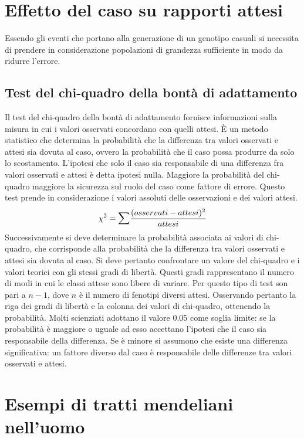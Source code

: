 \section{Effetto del caso su rapporti attesi}
Essendo gli eventi che portano alla generazione di un genotipo casuali si necessita di prendere in considerazione popolazioni di grandezza sufficiente in modo da ridurre l'errore.
\subsection{Test del chi-quadro della bont\`a di adattamento}
Il test del chi-quadro della bont\`a di adattamento fornisce informazioni sulla misura in cui i valori osservati concordano con quelli attesi. \`E un metodo statistico che determina la probabilit\`a
che la differenza tra valori osservati e attesi sia dovuta al caso, ovvero la probabilit\`a che il caso possa produrre da solo lo scostamento. L'ipotesi che solo il caso sia responsabile di una
differenza fra valori osservati e attesi \`e detta ipotesi nulla. Maggiore la probabilit\`a del chi-quadro maggiore la sicurezza sul ruolo del caso come fattore di errore. Questo test prende in
considerazione i valori assoluti delle osservazioni e dei valori attesi. 
$$\chi^2=\mathlarger{\sum}\dfrac{(osservati-attesi)^2}{attesi}$$
Successivamente si deve determinare la probabilit\`a associata ai valori di chi-quadro, che corrisponde alla probabilit\`a che la differenza tra valori osservati e attesi sia dovuta al caso. Si deve
pertanto confrontare un valore del chi-quadro e i valori teorici con gli stessi gradi di libert\`a. Questi gradi rappresentano il numero di modi in cui le classi attese sono libere di variare. Per
questo tipo di test son pari a $n-1$, dove $n$ \`e il numero di fenotipi diversi attesi. Osservando pertanto la riga dei gradi di libert\`a e la colonna dei valori di chi-quadro, ottenendo la 
probabilit\`a. Molti scienziati adottano il valore $0.05$ come soglia limite: se la probabilit\`a \`e maggiore o uguale ad esso accettano l'ipotesi che il caso sia responsabile della differenza. Se 
\`e minore si assumono che esiste una differenza significativa: un fattore diverso dal caso \`e responsabile delle differenze tra valori osservati e attesi. 
\section{Esempi di tratti mendeliani nell'uomo}
